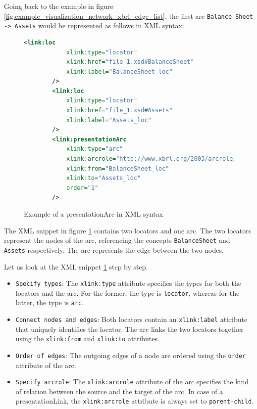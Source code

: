 Going back to the example in figure \ref{fig:example_visualization_network_xbrl_edge_list}, 
the first arc \texttt{Balance Sheet -> Assets} would be represented as follows in XML syntax:

\begin{figure}[H]
    \centering
    \begin{lstlisting}[language=XML]
        <link:loc 
            xlink:type="locator" 
            xlink:href="file_1.xsd#BalanceSheet"
            xlink:label="BalanceSheet_loc"
        />
        <link:loc 
            xlink:type="locator" 
            xlink:href="file_1.xsd#Assets"
            xlink:label="Assets_loc"
        />
        <link:presentationArc 
            xlink:type="arc" 
            xlink:arcrole="http://www.xbrl.org/2003/arcrole/parent-child" 
            xlink:from="BalanceSheet_loc" 
            xlink:to="Assets_loc"
            order="1"
        />
    \end{lstlisting}
    \caption{Example of a presentationArc in XML syntax}
    \label{fig:example_presentation_arc_xml}
\end{figure}

The XML snippet in figure \ref{fig:example_presentation_arc_xml} contains two locators and one arc.
The two locators represent the nodes of the arc, referencing the concepts \texttt{BalanceSheet} and \texttt{Assets} respectively.
The arc represents the edge between the two nodes.

Let us look at the XML snippet \ref{fig:example_presentation_arc_xml} step by step.

\begin{itemize}
    \item \texttt{Specify types}: The \texttt{xlink:type} attribute specifies the types for both the locators and the arc.
    For the former, the type is \texttt{locator}, whereas for the latter, the type is \texttt{arc}.
    \item \texttt{Connect nodes and edges}: Both locators contain an \texttt{xlink:label} attribute that uniquely identifies the locator.
    The arc links the two locators together using the \texttt{xlink:from} and \texttt{xlink:to} attributes.
    \item \texttt{Order of edges}: The outgoing edges of a node are ordered using the \texttt{order} attribute of the arc.
    \item \texttt{Specify arcrole}: The \texttt{xlink:arcrole} attribute of the arc specifies the kind of relation between the source and the target of the arc.
    In case of a presentationLink, the \texttt{xlink:arcrole} attribute is always set to \texttt{parent-child}.\label{sec:arcrole}
\end{itemize}

